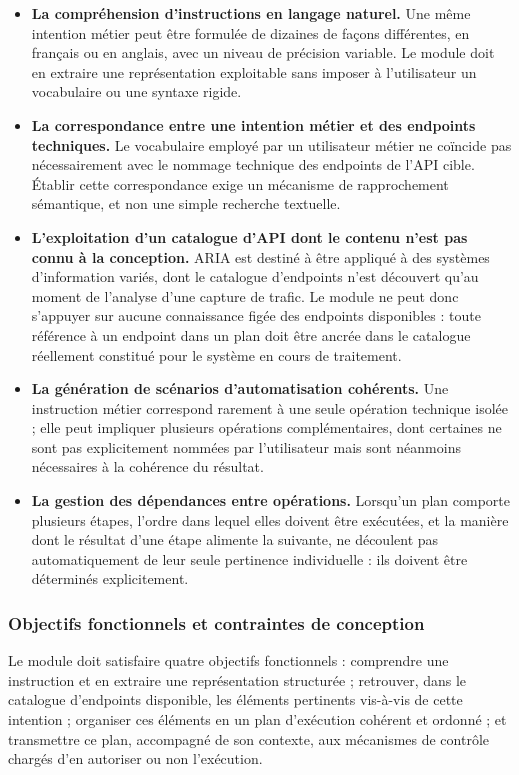 \begin{itemize}
    \item \textbf{La compréhension d'instructions en langage naturel.} Une même intention métier peut être formulée de dizaines de façons différentes, en français ou en anglais, avec un niveau de précision variable. Le module doit en extraire une représentation exploitable sans imposer à l'utilisateur un vocabulaire ou une syntaxe rigide.
    \item \textbf{La correspondance entre une intention métier et des endpoints techniques.} Le vocabulaire employé par un utilisateur métier ne coïncide pas nécessairement avec le nommage technique des endpoints de l'API cible. Établir cette correspondance exige un mécanisme de rapprochement sémantique, et non une simple recherche textuelle.
    \item \textbf{L'exploitation d'un catalogue d'API dont le contenu n'est pas connu à la conception.} ARIA est destiné à être appliqué à des systèmes d'information variés, dont le catalogue d'endpoints n'est découvert qu'au moment de l'analyse d'une capture de trafic. Le module ne peut donc s'appuyer sur aucune connaissance figée des endpoints disponibles : toute référence à un endpoint dans un plan doit être ancrée dans le catalogue réellement constitué pour le système en cours de traitement.
    \item \textbf{La génération de scénarios d'automatisation cohérents.} Une instruction métier correspond rarement à une seule opération technique isolée ; elle peut impliquer plusieurs opérations complémentaires, dont certaines ne sont pas explicitement nommées par l'utilisateur mais sont néanmoins nécessaires à la cohérence du résultat.
    \item \textbf{La gestion des dépendances entre opérations.} Lorsqu'un plan comporte plusieurs étapes, l'ordre dans lequel elles doivent être exécutées, et la manière dont le résultat d'une étape alimente la suivante, ne découlent pas automatiquement de leur seule pertinence individuelle : ils doivent être déterminés explicitement.
\end{itemize}

\subsubsection{Objectifs fonctionnels et contraintes de conception}

Le module doit satisfaire quatre objectifs fonctionnels : comprendre une instruction et en extraire une représentation structurée ; retrouver, dans le catalogue d'endpoints disponible, les éléments pertinents vis-à-vis de cette intention ; organiser ces éléments en un plan d'exécution cohérent et ordonné ; et transmettre ce plan, accompagné de son contexte, aux mécanismes de contrôle chargés d'en autoriser ou non l'exécution.


